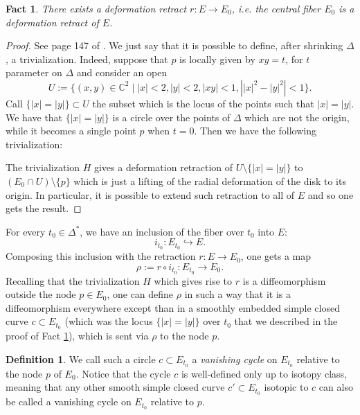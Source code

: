 \documentclass[a4paper,12 pt,titlepage,twoside]{book}
\newcommand{\numberset}{\mathbb}
\newcommand{\C}{\numberset{C}}
\theoremstyle{plain}
\theoremstyle{theorem}
\newtheorem{fact}[thm]{\textbf{Fact}}
\theoremstyle{definition}
\newtheorem{defn}[thm]{Definition}
\theoremstyle{remark}
\begin{document}
\begin{fact}\label{fact: retraction}
	There exists a deformation retract $r \colon E \rightarrow E_0$, i.e. the central fiber $E_0$ is a deformation retract of $E$.
\end{fact}
\begin{proof}
	See page 147 of \cite{MR2807457}. We just say that it is possible to define, after shrinking $\Delta$, a trivialization. Indeed, suppose that $p$ is locally given by $xy=t$, for $t$ parameter on $\Delta$ and consider an open \begin{equation}\label{eq: open U} U := \{(x,y) \in \C^2 \mid |x|< 2, |y|<2, |xy|<1, \left||x|^2 - |y|^2\right|<1\}.\end{equation} Call $\{|x|=|y|\} \subset U$ the subset which is the locus of the points such that $|x|=|y|.$ We have that $\{|x|=|y|\}$ is a circle over the points of $\Delta$ which are not the origin, while it becomes a single point $p$ when $t=0.$ Then we have the following trivialization:
	\begin{center}
	\end{center}
	The trivialization $H$ gives a deformation retraction of $U \setminus \{|x|=|y|\}$ to $(E_0 \cap U) \setminus \{p\}$ which is just a lifting of the radial deformation of the disk to its origin. In particular, it is possible to extend such retraction to all of $E$ and so one gets the result.
\end{proof}
For every $t_0  \in \Delta^*$, we have an inclusion of the fiber over $t_0$ into $E$: $$i_{t_0} \colon E_{t_0} \hookrightarrow E.$$ Composing this inclusion with the retraction $r \colon E \rightarrow E_0$, one gets a map $$\rho:= r \circ i_{t_0} \colon E_{t_0} \rightarrow E_0.$$ Recalling that the trivialization $H$ which gives rise to $r$ is a diffeomorphism outside the node $p \in E_0$, one can define $\rho$ in such a way that it is a diffeomorphism everywhere except than in a smoothly embedded simple closed curve $c \subset E_{t_0}$ (which was the locus $\{|x|=|y|\}$ over $t_0$ that we described in the proof of Fact \ref{fact: retraction}), which is sent via $\rho$ to the node $p$.
\begin{defn}
	We call such a circle $c\subset E_{t_0}$ a \emph{vanishing cycle} on $E_{t_0}$ relative to the node $p$ of $E_0$. Notice that the cycle $c$ is well-defined only up to isotopy class, meaning that any other smooth simple closed curve $c'\subset E_{t_0}$ isotopic to $c$ can also be called a vanishing cycle on $E_{t_0}$ relative to $p$.
\end{defn}
\end{document}
